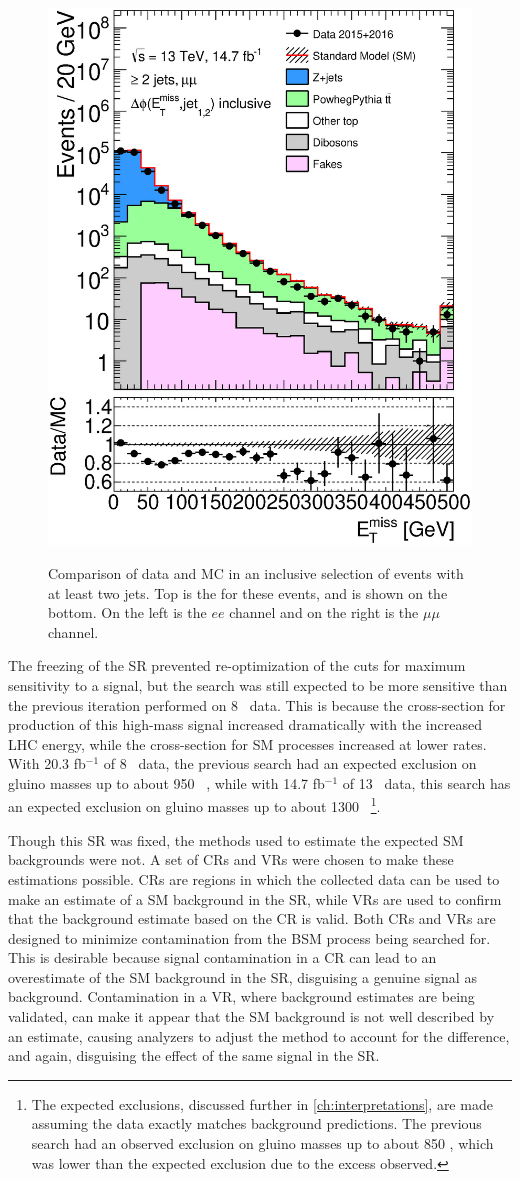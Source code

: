 \begin{figure}[!htb]
\includegraphics[width=.48\textwidth]{figures/signalacceptcontam/met_mm_preselection_R_a.eps}\\
\caption{
Comparison of data and \ac{MC} in an inclusive selection of events with at least two jets. Top is the \HT for these events, and \met is shown on the bottom. On the left is the $ee$ channel and on the right is the $\mu\mu$ channel. 
\label{fig:datamc_inc}
}
\end{figure}

The freezing of the \ac{SR} prevented re-optimization of the cuts for maximum sensitivity to a signal, but the search was still expected to be more sensitive than the previous iteration performed on 8 \tev~data. This is because the cross-section for production of this high-mass signal increased dramatically with the increased \ac{LHC} energy, while the cross-section for \ac{SM} processes increased at lower rates. With 20.3 fb$^{-1}$ of 8 \tev~data, the previous search had an expected exclusion on gluino masses up to about 950 \gev~\cite{SUSY-2014-10}, while with 14.7 fb$^{-1}$ of 13 \tev~data, this search has an expected exclusion on gluino masses up to about 1300 \gev~\footnote{The expected exclusions, discussed further in \autoref{ch:interpretations}, are made assuming the data exactly matches background predictions. The previous search had an observed exclusion on gluino masses up to about 850 \gev, which was lower than the expected exclusion due to the excess observed.}.

Though this \ac{SR} was fixed, the methods used to estimate the expected \ac{SM} backgrounds were not. A set of \acfp{CR} and \acfp{VR} were chosen to make these estimations possible. \acp{CR} are regions in which the collected data can be used to make an estimate of a \ac{SM} background in the \ac{SR}, while \acp{VR} are used to confirm that the background estimate based on the \ac{CR} is valid. Both \acp{CR} and \acp{VR} are designed to minimize contamination from the \ac{BSM} process being searched for. This is desirable because signal contamination in a \ac{CR} can lead to an overestimate of the \ac{SM} background in the \ac{SR}, disguising a genuine signal as background. Contamination in a \ac{VR}, where background estimates are being validated, can make it appear that the \ac{SM} background is not well described by an estimate, causing analyzers to adjust the method to account for the difference, and again, disguising the effect of the same signal in the \ac{SR}. 

